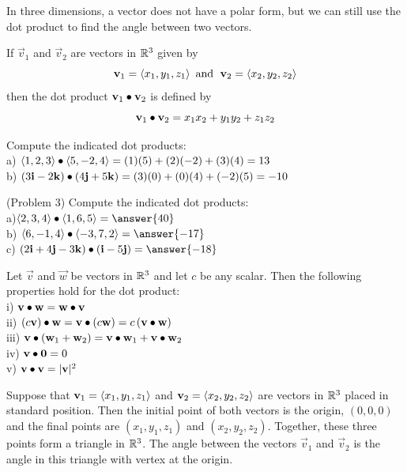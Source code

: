 \documentclass[handout]{ximera}
\begin{document}
In three dimensions, a vector does not have a polar form, but we can still use the dot product to find the angle between two vectors.
\begin{definition}
If $\vec{v}_1$ and $\vec{v}_2$ are vectors in $\mathbb R^3$ given by
\[
\mathbf{v}_1 = \left\langle x_1, y_1, z_1\right\rangle \text{  and   } \;\mathbf{v}_2 = \left\langle x_2, y_2, z_2\right\rangle
\]
then the dot product $\mathbf{v}_1 \bullet \mathbf{v}_2$ is defined by
\[
\mathbf{v}_1 \bullet \mathbf{v}_2 = x_1x_2 + y_1y_2 + z_1z_2
\]
\end{definition}

\begin{example}[Example 3]
Compute the indicated dot products:\\
a) $\left\langle 1, 2, 3\right\rangle \bullet \left\langle 5, -2, 4\right\rangle = (1)(5)+ (2)(-2) + (3)(4) = 13$\\
b) $\left(3\mathbf{i} - 2\mathbf{k}\right) \bullet \left(4\mathbf{j} + 5\mathbf{k}\right) = (3)(0) + (0)(4) + (-2)(5) = -10$
\end{example}

\begin{problem}(Problem 3)
Compute the indicated dot products:\\
a)$\vector{2, 3, 4} \dotp \vector{1, 6, 5} = \answer{40}$\\
b) $\vector{6, -1, 4} \dotp \vector{-3, 7, 2} = \answer{-17}$\\
c) $\left(2\vec{i} + 4\vec{j} - 3\vec{k}\right) \dotp \left(\vec{i} -5\vec{j}\right) = \answer{-18}$
\end{problem}


\begin{proposition}
Let $\vec{v}$ and $ \vec{w}$ be vectors in $\mathbb R^3$ and let $c$ be any scalar. 
Then the following properties hold for the dot product:\\
i) $\mathbf{v} \bullet \mathbf{w} =\mathbf{w} \bullet \mathbf{v}$\\
ii) $\left(c\mathbf{v}\right) \bullet \mathbf{w} =\mathbf{v} \bullet \left(c\mathbf{w}\right) = c\left(\mathbf{v} \bullet \mathbf{w}\right)$\\
iii)  $\mathbf{v} \bullet \left(\mathbf{w}_1 +\mathbf{w}_2\right) =\mathbf{v} \bullet\mathbf{w}_1 +\mathbf{v}\bullet \mathbf{w}_2$\\
iv) $\mathbf{v} \bullet \mathbf{0} = 0$\\
v) $\mathbf{v} \bullet \mathbf{v} = |\mathbf{v}|^2$
\end{proposition}

Suppose that $\mathbf{v}_1=\left\langle x_1, y_1, z_1\right\rangle$ and $\mathbf{v}_2=\left\langle x_2, y_2, z_2\right\rangle$  are vectors in $\mathbb R^3$ placed in standard position.  
Then the initial point of both vectors is the origin, $(0,0,0)$ and the final points are
$(x_1, y_1, z_1)$ and $(x_2, y_2, z_2)$.  Together, these three points form a triangle in $\mathbb R^3$.  
The angle between the vectors $\vec{v}_1$ and $\vec{v}_2$ is the angle in this triangle with vertex at the origin.
\end{document}
